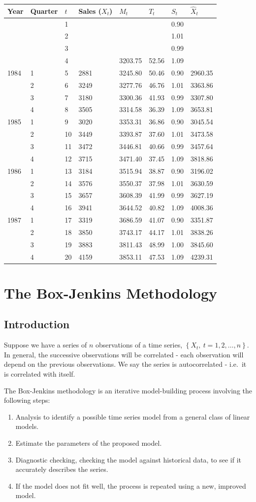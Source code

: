 \documentclass[12pt,a4paper,openany,twoside]{report}
\theoremstyle{definition}
\theoremstyle{remark}
\theoremstyle{plain}
\theoremstyle{definition}
\theoremstyle{definition}
\theoremstyle{definition}
\theoremstyle{remark}
\begin{document}
\begin{longtable}[c]{@{}llllllll@{}}
\toprule
Year & Quarter & $t$ & Sales ($X_t$) &
$M_t$ & $T_t$ & $S_t$ & $\hat{X}_t$ \tabularnewline
\midrule
\endhead
& & 1 & & & & 0.90 &\tabularnewline
& & 2 & & & & 1.01 &\tabularnewline
& & 3 & & & & 0.99 &\tabularnewline
& & 4 & & 3203.75 & 52.56 & 1.09 &\tabularnewline
1984 & 1 & 5 & 2881 & 3245.80 & 50.46 & 0.90 &
2960.35\tabularnewline
& 2 & 6 & 3249 & 3277.76 & 46.76 & 1.01 &
3363.86\tabularnewline
& 3 & 7 & 3180 & 3300.36 & 41.93 & 0.99 &
3307.80\tabularnewline
& 4 & 8 & 3505 & 3314.58 & 36.39 & 1.09 &
3653.81\tabularnewline
1985 & 1 & 9 & 3020 & 3353.31 & 36.86 & 0.90 &
3045.54\tabularnewline
& 2 & 10 & 3449 & 3393.87 & 37.60 & 1.01 &
3473.58\tabularnewline
& 3 & 11 & 3472 & 3446.81 & 40.66 & 0.99 &
3457.64\tabularnewline
& 4 & 12 & 3715 & 3471.40 & 37.45 & 1.09 &
3818.86\tabularnewline
1986 & 1 & 13 & 3184 & 3515.94 & 38.87 & 0.90 &
3196.02\tabularnewline
& 2 & 14 & 3576 & 3550.37 & 37.98 & 1.01 &
3630.59\tabularnewline
& 3 & 15 & 3657 & 3608.39 & 41.99 & 0.99 &
3627.19\tabularnewline
& 4 & 16 & 3941 & 3644.52 & 40.82 & 1.09 &
4008.36\tabularnewline
1987 & 1 & 17 & 3319 & 3686.59 & 41.07 & 0.90 &
3351.87\tabularnewline
& 2 & 18 & 3850 & 3743.17 & 44.17 & 1.01 &
3838.26\tabularnewline
& 3 & 19 & 3883 & 3811.43 & 48.99 & 1.00 &
3845.60\tabularnewline
& 4 & 20 & 4159 & 3853.11 & 47.53 & 1.09 &
4239.31\tabularnewline
\bottomrule
\end{longtable}

\hypertarget{boxjenkinschap}{%
\chapter{The Box-Jenkins Methodology}\label{boxjenkinschap}}

\hypertarget{introduction}{%
\section{Introduction}\label{introduction}}

Suppose we have a series of \(n\) observations of a time series,
\(\left\{ X_{t},\ t = 1,2,\ldots,n \right\}\). In general, the
successive observations will be correlated - each observation will
depend on the previous observations. We say the series is
autocorrelated - i.e.~it is correlated with itself.

The Box-Jenkins methodology is an iterative model-building process
involving the following steps:

\begin{enumerate}
\def\labelenumi{\arabic{enumi})}
\item
  Analysis to identify a possible time series model from a general class
  of linear models.
\item
  Estimate the parameters of the proposed model.
\item
  Diagnostic checking, checking the model against historical data, to
  see if it accurately describes the series.
\item
  If the model does not fit well, the process is repeated using a new,
  improved model.
\end{enumerate}
\end{document}
